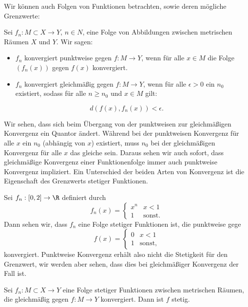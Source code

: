 \documentclass[letterpaper,10pt,english]{jupyterBook}
\begin{document}
Wir können auch Folgen von Funktionen betrachten, sowie deren mögliche Grenzwerte:
\label{stetigkeit/glm:definition-3}
\begin{definition}{}{}



Sei \(f_n: M \subset X \rightarrow Y\), \(n \in N\), eine Folge von Abbildungen zwischen metrischen Räumen \(X\) und \(Y\). Wir sagen:
\begin{itemize}
\item {} 
\(f_n\) konvergiert punktweise gegen \(f: M \rightarrow Y\), wenn für alle \(x \in M\) die Folge \((f_n(x))\) gegen \(f(x)\) konvergiert.

\item {} 
\(f_n\) konvergiert gleichmäßig gegen \(f: M \rightarrow Y\), wenn für alle \(\epsilon > 0\) ein \(n_0\) existiert, sodass für alle \(n \geq n_0\) und \(x \in M\) gilt:

\end{itemize}
\begin{equation*}
 d(f(x),f_n(x)) < \epsilon.
\end{equation*}\end{definition}

Wir sehen, dass sich beim Übergang von der punktweisen zur gleichmäßigen Konvergenz ein Quantor ändert. Während bei der punktweisen Konvergenz für alle \(x\) ein \(n_0\) (abhängig von \(x\)) existiert, muss \(n_0\) bei der gleichmäßigen Konvergenz für alle \(x\) das gleiche sein. Daraus sehen wir auch sofort, dass gleichmäßige Konvergenz einer Funktionenfolge immer auch punktweise Konvergenz impliziert.
Ein Unterschied der beiden Arten von Konvergenz ist die Eigenschaft des Grenzwerts stetiger Funktionen.
\label{stetigkeit/glm:example-4}
\begin{example}{}{}



Sei \(f_n: [0,2] \rightarrow \R\) definiert durch
\begin{equation*}
 f_n(x) = \left\{ \begin{matrix} x^n & x < 1 \\ 1 & \text{sonst.} \end{matrix} \right.
\end{equation*}
Dann sehen wir, dass \(f_n\) eine Folge stetiger Funktionen ist, die punktweise gege
\begin{equation*}
 f (x) = \left\{ \begin{matrix} 0 & x < 1 \\ 1 & \text{sonst,} \end{matrix} \right.
\end{equation*}
konvergiert. Punktweise Konvergenz erhält also nicht die Stetigkeit für den Grenzwert, wir werden aber sehen, dass dies bei gleichmäßiger Konvergenz der Fall ist.
\end{example}
\label{stetigkeit/glm:theorem-5}
\begin{theorem}{}{}



Sei \(f_n: M \subset X \rightarrow Y\) eine Folge stetiger Funktionen zwischen metrischen Räumen, die gleichmäßig gegen \(f: M \rightarrow Y\) konvergiert. Dann ist \(f\) stetig.
\end{theorem}
\end{document}
